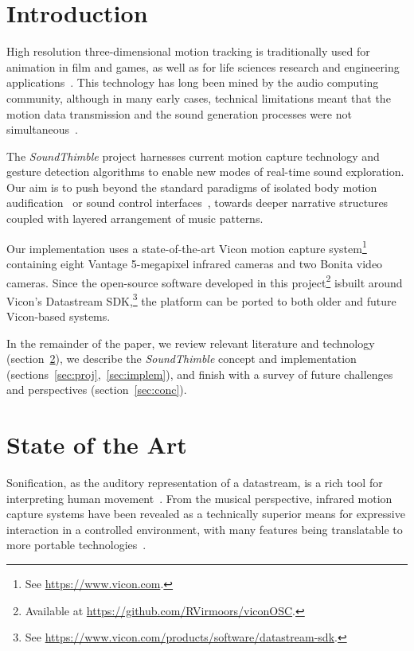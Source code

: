\section{Introduction}

High resolution three-dimensional motion tracking is traditionally used for animation in film and games, as well as for life sciences research and engineering applications~\cite{welch2002motion}. This technology has long been mined by the audio computing community, although in many early cases, technical limitations meant that the motion data transmission and the sound generation processes were not simultaneous~\cite{dobrian2003gestural, kapur2005framework}.


The \textit{SoundThimble} project harnesses current motion capture technology and gesture detection algorithms to enable new modes of real-time sound exploration. Our aim is to push beyond the standard paradigms of isolated body motion audification~\cite{dobrian2003gestural,kapur2005framework} or sound control interfaces~\cite{eckel2009motion,nymoen2011soundsaber}, towards deeper narrative structures coupled with layered arrangement of music patterns.


Our implementation uses a state-of-the-art Vicon motion capture system\footnote{See  \url{https://www.vicon.com}.} containing eight Vantage 5-megapixel infrared cameras and two Bonita video cameras. Since the open-source software developed in this project\footnote{Available at  \url{https://github.com/RVirmoors/viconOSC}.} is\linebreak built around Vicon's Datastream SDK,\footnote{See  \url{https://www.vicon.com/products/software/datastream-sdk}.} the platform can be ported to both older and future Vicon-based systems.

In the remainder of the paper, we review relevant literature and technology (section~\ref{sec:related}), we describe the \textit{SoundThimble} concept and implementation (sections~\ref{sec:proj},~\ref{sec:implem}), and finish with a survey of future challenges and perspectives (section~\ref{sec:conc}).

\section{State of the Art}
\label{sec:related}

Sonification, as the auditory representation of a datastream, is a rich tool for interpreting human movement~\cite{hermann2011sonification}. From the musical perspective, infrared motion capture systems have been revealed as a technically superior means for expressive interaction in a controlled environment, with many features being translatable to more portable technologies~\cite{skogstad2010using,vigliensoni2012quantitative}.

